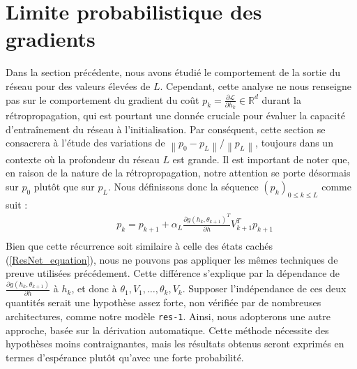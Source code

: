 \section{Limite probabilistique des gradients}\label{lim_proba_grad}

Dans la section précédente, nous avons étudié le comportement de la sortie du réseau pour des valeurs élevées de $L$. Cependant, cette analyse ne nous renseigne pas sur le comportement du gradient du coût $p_k = \frac{\partial \mathscr{L}}{\partial h_k} \in \mathbb{R}^d$ durant la rétropropagation, qui est pourtant une donnée cruciale pour évaluer la capacité d'entraînement du réseau à l'initialisation. Par conséquent, cette section se consacrera à l'étude des variations de $\left\| p_0 - p_L \right\| / \left\| p_L \right\|$, toujours dans un contexte où la profondeur du réseau $L$ est grande. Il est important de noter que, en raison de la nature de la rétropropagation, notre attention se porte désormais sur $p_0$ plutôt que sur $p_L$. Nous définissons donc la séquence $(p_k)_{0 \leqslant k \leqslant L}$ comme suit :
\begin{align*}
    \qquad & p_k = p_{k+1} + \alpha _L \frac{\partial g(h_k, \theta _{k+1}) ^T}{\partial h}  V_{k+1}^T p_{k+1} \\
\end{align*}
Bien que cette récurrence soit similaire à celle des états cachés (\cref{ResNet_equation}), nous ne pouvons pas appliquer les mêmes techniques de preuve utilisées précédement. Cette différence s'explique par la dépendance de $\frac{\partial g(h_k, \theta_{k+1})}{\partial h}$ à $h_k$, et donc à $\theta_1, V_1, \dots, \theta_k, V_k$. Supposer l'indépendance de ces deux quantités serait une hypothèse assez forte, non vérifiée par de nombreuses architectures, comme notre modèle \texttt{res-1}. Ainsi, nous adopterons une autre approche, basée sur la dérivation automatique. Cette méthode nécessite des hypothèses moins contraignantes, mais les résultats obtenus seront exprimés en termes d'espérance plutôt qu'avec une forte probabilité.

